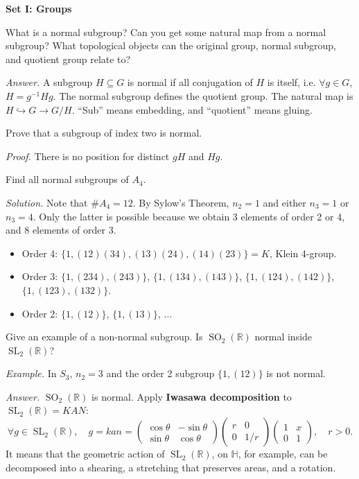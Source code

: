 \documentclass{mathproblems}
\newcommand\R{\mathbb{R}}
\begin{document}
\centerline {\textbf{Set I: Groups}}

\begin{questions}
\miquestion
{\color{blue} What is a normal subgroup? Can you get some natural map from a normal subgroup? What topological objects can the original group, normal subgroup, and quotient group relate to?}

\textit{Answer.} A subgroup $H\subseteq G$ is normal if all conjugation of $H$ is itself, i.e. $\forall g\in G$, $H=g^{-1}Hg$. The normal subgroup defines the quotient group. The natural map is $H\hookrightarrow G \rightarrow G/H$. ``Sub'' means embedding, and ``quotient'' means gluing.


\miquestion
{\color{blue} Prove that a subgroup of index two is normal.}

\textit{Proof.} There is no position for distinct $gH$ and $Hg$.


\miquestion
{\color{blue} Find all normal subgroups of $A_4$.}

\textit{Solution.} Note that $\#A_4=12$. By Sylow's Theorem, $n_2=1$ and either $n_3=1$ or $n_3=4$. Only the latter is possible because we obtain 3 elements of order 2 or 4, and 8 elements of order 3. \vspace{-4pt}
\begin{itemize}
    \item Order 4: $\{1,(12)(34),(13)(24),(14)(23)\}=K$, Klein 4-group.
    \item Order 3: $\{1,(234),(243)\}$, $\{1,(134),(143)\}$, $\{1,(124),(142)\}$, $\{1,(123),(132)\}$.
    \item Order 2: $\{1,(12)\}$, $\{1,(13)\}$, $\ldots$
\end{itemize}


\miquestion
{\color{blue} Give an example of a non-normal subgroup. Is $\operatorname{SO}_2(\R)$ normal inside $\operatorname{SL}_2(\R)$?}

\textit{Example.}
In $S_3$, $n_2=3$ and the order 2 subgroup $\{1,(12)\}$ is not normal.

\textit{Answer.} 
$\operatorname{SO}_2(\R)$ is normal. Apply {\color{violet}\textbf{Iwasawa decomposition}} to $\operatorname{SL}_2(\R)=KAN$:
$$
\forall g\in \operatorname{SL}_2(\R),\quad g=kan=\begin{pmatrix}\cos \theta & -\sin \theta \\ \sin \theta & \cos \theta
\end{pmatrix} \begin{pmatrix}r & 0\\ 0 & 1/r\end{pmatrix} \begin{pmatrix}1 & x\\ 0 & 1\end{pmatrix},\quad r>0.
$$
It means that the geometric action of $\operatorname{SL}_2(\R)$, on $\mathbb{H}$, for example, can be decomposed into a shearing, a stretching that preserves areas, and a rotation.


\end{questions}
\end{document}
